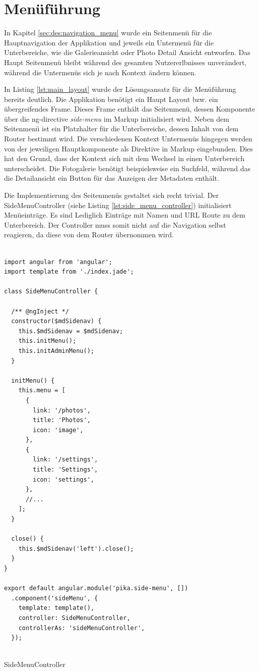 \section{Menüführung}

In Kapitel \ref{sec:des:navigation_menu} wurde ein Seitenmenü für die Hauptnavigation der Applikation und jeweils ein Untermenü für die Unterbereiche, wie die Galerieansicht oder Photo Detail Ansicht entworfen. Das Haupt Seitenmenü bleibt während des gesamten Nutzererlbnisses unverändert, während die Untermenüs sich je nach Kontext ändern können.

In Listing \ref{lst:main_layout} wurde der Lösungsansatz für die Menüführung bereits deutlich. Die Applikation benötigt ein Haupt Layout bzw. ein übergreifendes Frame. Dieses Frame enthält das Seitenmenü, dessen Komponente über die \gls{ng-directive} \textit{side-menu} im Markup initialisiert wird. Neben dem Seitenmenü ist ein Platzhalter für die Unterbereiche, dessen Inhalt von dem Router bestimmt wird. Die verschiedenen Kontext Untermenüs hingegen werden von der jeweiligen Hauptkomponente als Direktive in Markup eingebunden. Dies hat den Grund, dass der Kontext sich mit dem Wechsel in einen Unterbereich unterscheidet. Die Fotogalerie benötigt beispielsweise ein Suchfeld, während das die Detailansicht ein Button für das Anzeigen der Metadaten enthält.

Die Implementierung des Seitenmenüs gestaltet sich recht trivial. Der SideMenuController (siehe Listing \ref{lst:side_menu_controller}) initialisiert Menüeinträge. Es sind Lediglich Einträge mit Namen und URL Route zu dem Unterbereich. Der Controller muss somit nicht auf die Navigation selbst reagieren, da diese von dem Router übernommen wird.

\begin{listing}[H]
\begin{verbatim}

import angular from 'angular';
import template from './index.jade';

class SideMenuController {

  /** @ngInject */
  constructor($mdSidenav) {
    this.$mdSidenav = $mdSidenav;
    this.initMenu();
    this.initAdminMenu();
  }

  initMenu() {
    this.menu = [
      {
        link: '/photos',
        title: 'Photos',
        icon: 'image',
      },
      {
        link: '/settings',
        title: 'Settings',
        icon: 'settings',
      },
      //...
    ];
  }

  close() {
    this.$mdSidenav('left').close();
  }
}

export default angular.module('pika.side-menu', [])
  .component('sideMenu', {
    template: template(),
    controller: SideMenuController,
    controllerAs: 'sideMenuController',
  });


\end{verbatim}
\caption{SideMenuController}
\label{lst:side_menu_controller}
\end{listing} 


